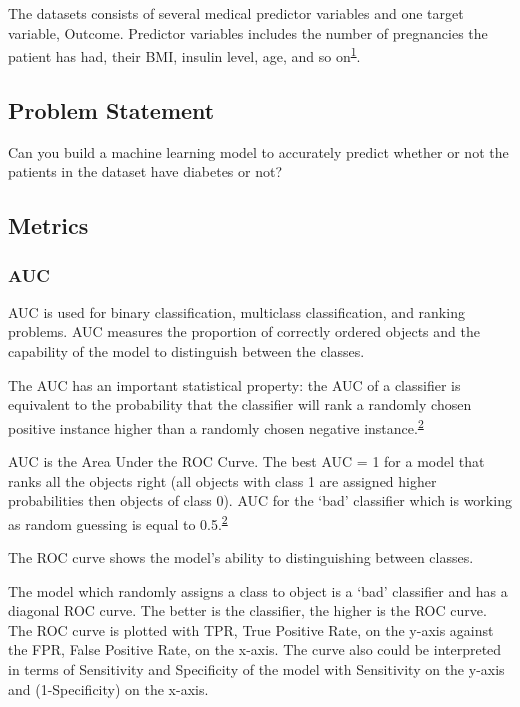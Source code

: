 \documentclass[
]{article}
\begin{document}
The datasets consists of several medical predictor variables and one
target variable, Outcome. Predictor variables includes the number of
pregnancies the patient has had, their BMI, insulin level, age, and so
on\textsuperscript{\protect\hyperlink{ref-ehr}{1}}.

\hypertarget{problem-statement}{%
\subsection{Problem Statement}\label{problem-statement}}

Can you build a machine learning model to accurately predict whether or
not the patients in the dataset have diabetes or not?

\hypertarget{metrics}{%
\subsection{Metrics}\label{metrics}}

\hypertarget{auc}{%
\subsubsection{AUC}\label{auc}}

AUC is used for binary classification, multiclass classification, and
ranking problems. AUC measures the proportion of correctly ordered
objects and the capability of the model to distinguish between the
classes.

The AUC has an important statistical property: the AUC of a classifier
is equivalent to the probability that the classifier will rank a
randomly chosen positive instance higher than a randomly chosen negative
instance.\textsuperscript{\protect\hyperlink{ref-volo}{2}}

AUC is the Area Under the ROC Curve. The best AUC = 1 for a model that
ranks all the objects right (all objects with class 1 are assigned
higher probabilities then objects of class 0). AUC for the `bad'
classifier which is working as random guessing is equal to
0.5.\textsuperscript{\protect\hyperlink{ref-volo}{2}}

The ROC curve shows the model's ability to distinguishing between
classes.

The model which randomly assigns a class to object is a `bad' classifier
and has a diagonal ROC curve. The better is the classifier, the higher
is the ROC curve. The ROC curve is plotted with TPR, True Positive Rate,
on the y-axis against the FPR, False Positive Rate, on the x-axis. The
curve also could be interpreted in terms of Sensitivity and Specificity
of the model with Sensitivity on the y-axis and (1-Specificity) on the
x-axis.
\end{document}
